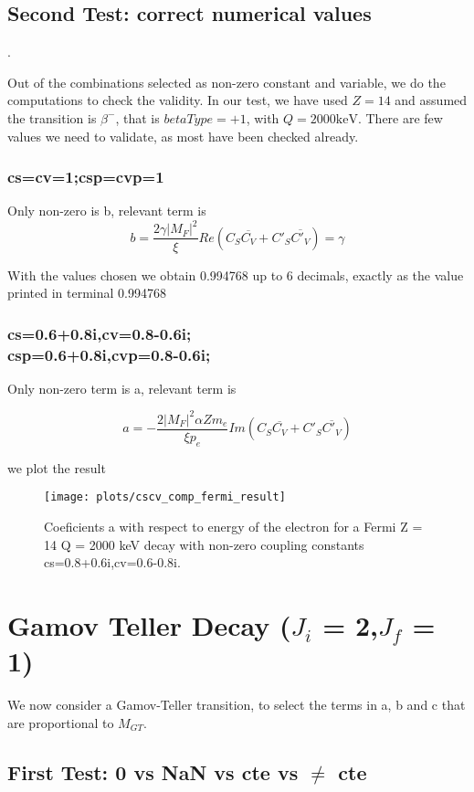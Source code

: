 \documentclass[twocolumn]{article}
\begin{document}
\subsection{Second Test: correct numerical values}.

Out of the combinations selected as non-zero constant and variable, we do the computations to check the validity. In our test, we have used $Z=14$ and assumed the transition is $\beta^-$, that is $betaType=+1$, with $Q = 2000\mathrm{keV}$. There are few values we need to validate, as most have been checked already.

\subsubsection{cs=cv=1;csp=cvp=1}

Only non-zero is b, relevant term is 
$$b = \frac{2\gamma|M_F|^2}{\xi}Re(C_S\overline{C_V}+C'_S\overline{C'_V}) = \gamma$$

With the values chosen we obtain 0.994768 up to 6 decimals, exactly as the value printed in terminal  0.994768


\subsubsection{cs=0.6+0.8i,cv=0.8-0.6i;\\csp=0.6+0.8i,cvp=0.8-0.6i;}

Only non-zero term is a, relevant term is

$$a = -\frac{2|M_F|^2 \alpha Z m_e}{\xi p_e}Im(C_S\overline{C_V}+C'_S\overline{C'_V})$$

we plot the result

\begin{figure}[H]
	\centering
	\texttt{[image: plots/cscv\_comp\_fermi\_result]}
	\caption{Coeficients a with respect to energy of the electron for a Fermi Z = 14 Q = 2000 keV decay  with non-zero coupling constants cs=0.8+0.6i,cv=0.6-0.8i.}
\end{figure}

\section{Gamov Teller Decay ($J_i$ = 2,$J_f$ = 1)}

We now consider a Gamov-Teller  transition, to select the terms in a, b and c that are proportional to $M_{GT}$. 

\subsection{First Test:  0 vs NaN vs cte  vs $\neq$ cte}
\end{document}
